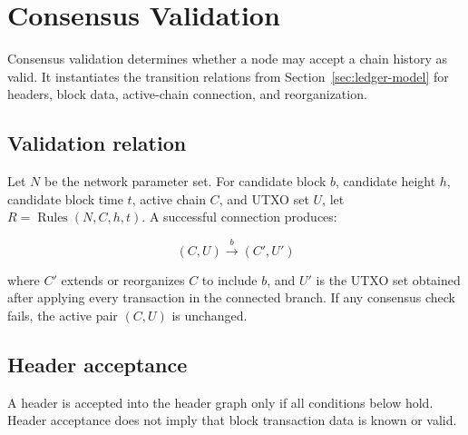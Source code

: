 \section{Consensus Validation}
\label{sec:consensus}

Consensus validation determines whether a node may accept a chain history as
valid. It instantiates the transition relations from
Section~\ref{sec:ledger-model} for headers, block data, active-chain
connection, and reorganization.

\subsection{Validation relation}

Let \(N\) be the network parameter set. For candidate block \(b\), candidate
height \(h\), candidate block time \(t\), active chain \(C\), and UTXO set
\(U\), let \(R=\operatorname{Rules}(N,C,h,t)\). A successful connection
produces:

\[
  (C, U) \xrightarrow{b} (C', U')
\]

where \(C'\) extends or reorganizes \(C\) to include \(b\), and \(U'\) is the UTXO set
obtained after applying every transaction in the connected branch. If any
consensus check fails, the active pair \((C,U)\) is unchanged.

\subsection{Header acceptance}

A header is accepted into the header graph only if all conditions below hold.
Header acceptance does not imply that block transaction data is known or valid.

